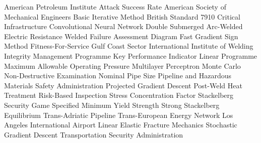 \begin{acronym}[STRATEGOS]
      {American Petroleum Institute}
      {Attack Success Rate}
     {American Society of Mechanical Engineers}
      {Basic Iterative Method}
   {British Standard 7910}
       {Critical Infrastructure}
      {Convolutional Neural Network}
     {Double Submerged Arc-Welded}
      {Electric Resistance Welded}
      {Failure Assessment Diagram}
     {Fast Gradient Sign Method}
      {Fitness-For-Service}
      {Gulf Coast Sector}
      {International Institute of Welding}
      {Integrity Management Programme}
      {Key Performance Indicator}
       {Linear Programme}
     {Maximum Allowable Operating Pressure}
      {Multilayer Perceptron}
       {Monte Carlo}
      {Non-Destructive Examination}
      {Nominal Pipe Size}
    {Pipeline and Hazardous Materials Safety Administration}
      {Projected Gradient Descent}
     {Post-Weld Heat Treatment}
      {Risk-Based Inspection}
      {Stress Concentration Factor}
      {Stackelberg Security Game}
     {Specified Minimum Yield Strength}
      {Strong Stackelberg Equilibrium}
      {Trans-Adriatic Pipeline}
    {Trans-European Energy Network}
      {Los Angeles International Airport}
     {Linear Elastic Fracture Mechanics}
      {Stochastic Gradient Descent}
      {Transportation Security Administration}
\end{acronym}
